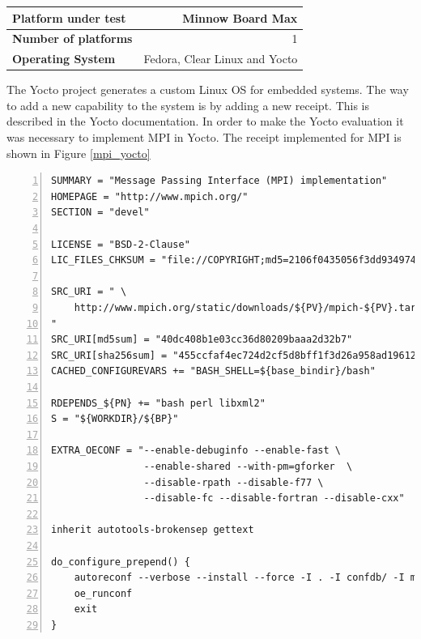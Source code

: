     \begin{center}
    \begin{tabular}{ | l | r |}
        \hline
        \textbf{Platform under test} & Minnow Board  Max \\ \hline
        \textbf{Number of platforms} & 1  \\ \hline
        \textbf{Operating System} & Fedora, Clear Linux and Yocto  \\ \hline
    \end{tabular}
    \label{tab:mpi_multiple_os_yocto}
    \end{center}

The Yocto project \cite{yocto-project} generates a custom Linux OS for
embedded systems. The way to add a new capability to the system is by adding a
new receipt. This is described in the Yocto documentation. In order to make the
Yocto evaluation it was necessary to implement MPI in Yocto. The receipt
implemented for MPI is shown in Figure \ref{mpi_yocto}

\begin{minipage}{\textwidth}
\end{minipage}

\begin{minipage}{\textwidth}

\begin{lstlisting}[frame=single,numbers=left,breaklines=true]
SUMMARY = "Message Passing Interface (MPI) implementation"
HOMEPAGE = "http://www.mpich.org/"
SECTION = "devel"

LICENSE = "BSD-2-Clause"
LIC_FILES_CHKSUM = "file://COPYRIGHT;md5=2106f0435056f3dd9349747a766e5816"

SRC_URI = " \
	http://www.mpich.org/static/downloads/${PV}/mpich-${PV}.tar.gz \
"
SRC_URI[md5sum] = "40dc408b1e03cc36d80209baaa2d32b7"
SRC_URI[sha256sum] = "455ccfaf4ec724d2cf5d8bff1f3d26a958ad196121e7ea26504fd3018757652d"
CACHED_CONFIGUREVARS += "BASH_SHELL=${base_bindir}/bash"

RDEPENDS_${PN} += "bash perl libxml2"
S = "${WORKDIR}/${BP}"

EXTRA_OECONF = "--enable-debuginfo --enable-fast \
                --enable-shared --with-pm=gforker  \
		        --disable-rpath --disable-f77 \
                --disable-fc --disable-fortran --disable-cxx"

inherit autotools-brokensep gettext

do_configure_prepend() {
    autoreconf --verbose --install --force -I . -I confdb/ -I maint/
    oe_runconf
    exit
}

\end{lstlisting}
\label{mpi_yocto} 
\end{minipage}

